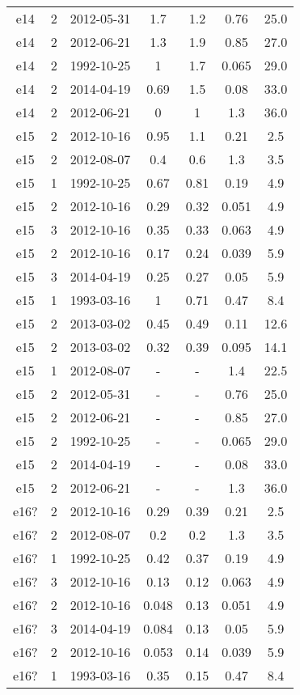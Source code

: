 \begin{table*}[htp]
\begin{tabular}{ccccccc}
e14 & 2 & 2012-05-31 & 1.7 & 1.2 & 0.76 & 25.0 \\
e14 & 2 & 2012-06-21 & 1.3 & 1.9 & 0.85 & 27.0 \\
e14 & 2 & 1992-10-25 & 1 & 1.7 & 0.065 & 29.0 \\
e14 & 2 & 2014-04-19 & 0.69 & 1.5 & 0.08 & 33.0 \\
e14 & 2 & 2012-06-21 & 0 & 1 & 1.3 & 36.0 \\
e15 & 2 & 2012-10-16 & 0.95 & 1.1 & 0.21 & 2.5 \\
e15 & 2 & 2012-08-07 & 0.4 & 0.6 & 1.3 & 3.5 \\
e15 & 1 & 1992-10-25 & 0.67 & 0.81 & 0.19 & 4.9 \\
e15 & 2 & 2012-10-16 & 0.29 & 0.32 & 0.051 & 4.9 \\
e15 & 3 & 2012-10-16 & 0.35 & 0.33 & 0.063 & 4.9 \\
e15 & 2 & 2012-10-16 & 0.17 & 0.24 & 0.039 & 5.9 \\
e15 & 3 & 2014-04-19 & 0.25 & 0.27 & 0.05 & 5.9 \\
e15 & 1 & 1993-03-16 & 1 & 0.71 & 0.47 & 8.4 \\
e15 & 2 & 2013-03-02 & 0.45 & 0.49 & 0.11 & 12.6 \\
e15 & 2 & 2013-03-02 & 0.32 & 0.39 & 0.095 & 14.1 \\
e15 & 1 & 2012-08-07 & - & - & 1.4 & 22.5 \\
e15 & 2 & 2012-05-31 & - & - & 0.76 & 25.0 \\
e15 & 2 & 2012-06-21 & - & - & 0.85 & 27.0 \\
e15 & 2 & 1992-10-25 & - & - & 0.065 & 29.0 \\
e15 & 2 & 2014-04-19 & - & - & 0.08 & 33.0 \\
e15 & 2 & 2012-06-21 & - & - & 1.3 & 36.0 \\
e16? & 2 & 2012-10-16 & 0.29 & 0.39 & 0.21 & 2.5 \\
e16? & 2 & 2012-08-07 & 0.2 & 0.2 & 1.3 & 3.5 \\
e16? & 1 & 1992-10-25 & 0.42 & 0.37 & 0.19 & 4.9 \\
e16? & 3 & 2012-10-16 & 0.13 & 0.12 & 0.063 & 4.9 \\
e16? & 2 & 2012-10-16 & 0.048 & 0.13 & 0.051 & 4.9 \\
e16? & 3 & 2014-04-19 & 0.084 & 0.13 & 0.05 & 5.9 \\
e16? & 2 & 2012-10-16 & 0.053 & 0.14 & 0.039 & 5.9 \\
e16? & 1 & 1993-03-16 & 0.35 & 0.15 & 0.47 & 8.4 \\

\end{tabular}
\end{table*}
